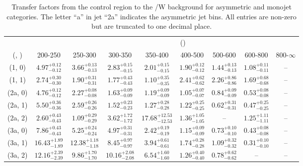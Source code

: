 \begin{table}[h!]
\tiny
\centering
\caption{Transfer factors from the \mmj control region to the \ttbar/W background for asymmetric and monojet categories. The letter ``a'' in jet \eg ``2a''  indicates the asymmetric jet bins. All entries are non-zero but are truncated to one decimal place.\label{tab:tf_mumu_ttw_asym}}
\begin{tabular}
{ccccccccc}
	\hline\hline
&	& \multicolumn{8}{c}{\scalht (\gev)} \\ 
	 (\njet,  \nb) & 200-250 & 250-300 & 300-350 & 350-400 & 400-500 & 500-600 & 600-800 & 800-$\infty$ \\ [0.8ex] 
\hline
	(1, 0) & $4.97^{+ 0.12 }_{- 0.12 }$ & $3.66^{+ 0.13 }_{- 0.13 }$ & $2.83^{+ 0.15 }_{- 0.15 }$ & $2.01^{+ 0.15 }_{- 0.15 }$ & $1.90^{+ 0.12 }_{- 0.12 }$ & $1.44^{+ 0.13 }_{- 0.13 }$ & $1.08^{+ 0.11 }_{- 0.11 }$ & -- \\[0.5ex] 
	(1, 1) & $2.74^{+ 0.30 }_{- 0.30 }$ & $1.90^{+ 0.31 }_{- 0.31 }$ & $1.77^{+ 0.43 }_{- 0.43 }$ & $1.10^{+ 0.35 }_{- 0.35 }$ & $2.41^{+ 0.62 }_{- 0.62 }$ & $2.26^{+ 0.86 }_{- 0.86 }$ & $1.69^{+ 0.68 }_{- 0.68 }$ & -- \\[0.5ex] 
	(2a, 0) & $4.76^{+ 0.12 }_{- 0.12 }$ & $2.27^{+ 0.08 }_{- 0.08 }$ & $1.63^{+ 0.09 }_{- 0.09 }$ & $1.19^{+ 0.09 }_{- 0.09 }$ & $1.05^{+ 0.07 }_{- 0.07 }$ & $0.84^{+ 0.09 }_{- 0.09 }$ & $0.53^{+ 0.08 }_{- 0.08 }$ & -- \\[0.5ex] 
	(2a, 1) & $5.50^{+ 0.36 }_{- 0.36 }$ & $2.59^{+ 0.26 }_{- 0.26 }$ & $1.52^{+ 0.23 }_{- 0.23 }$ & $1.27^{+ 0.28 }_{- 0.28 }$ & $1.22^{+ 0.25 }_{- 0.25 }$ & $0.62^{+ 0.31 }_{- 0.31 }$ & $0.47^{+ 0.25 }_{- 0.25 }$ & -- \\[0.5ex] 
	(2a, 2) & $2.60^{+ 0.43 }_{- 0.43 }$ & $1.09^{+ 0.29 }_{- 0.29 }$ & $3.62^{+ 1.72 }_{- 1.72 }$ & $17.68^{+ 12.53 }_{- 12.53 }$ & $1.36^{+ 1.05 }_{- 1.05 }$ & -- & $1.25^{+ 1.11 }_{- 1.11 }$ & -- \\[0.5ex] 
	(3a, 0) & $7.86^{+ 0.43 }_{- 0.43 }$ & $5.25^{+ 0.24 }_{- 0.24 }$ & $4.97^{+ 0.31 }_{- 0.31 }$ & $2.42^{+ 0.19 }_{- 0.19 }$ & $1.15^{+ 0.09 }_{- 0.09 }$ & $0.73^{+ 0.10 }_{- 0.10 }$ & $0.43^{+ 0.08 }_{- 0.08 }$ & -- \\[0.5ex] 
	(3a, 1) & $16.43^{+ 1.89 }_{- 1.89 }$ & $12.38^{+ 1.18 }_{- 1.18 }$ & $8.45^{+ 0.97 }_{- 0.97 }$ & $3.94^{+ 0.61 }_{- 0.61 }$ & $1.74^{+ 0.28 }_{- 0.28 }$ & $1.09^{+ 0.32 }_{- 0.32 }$ & $0.31^{+ 0.10 }_{- 0.10 }$ & -- \\[0.5ex] 
	(3a, 2) & $12.16^{+ 2.39 }_{- 2.39 }$ & $9.86^{+ 1.70 }_{- 1.70 }$ & $10.16^{+ 2.08 }_{- 2.08 }$ & $6.54^{+ 1.60 }_{- 1.60 }$ & $1.26^{+ 0.40 }_{- 0.40 }$ & $0.78^{+ 0.62 }_{- 0.62 }$ & -- & -- \\[0.5ex] 

\end{tabular}
\end{table}
